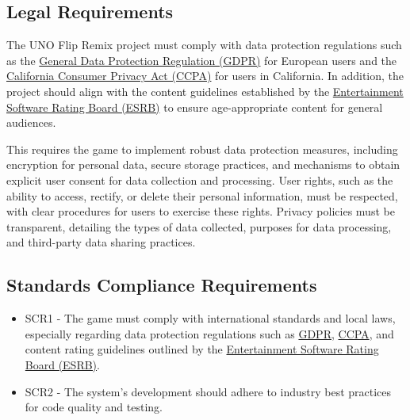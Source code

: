 \documentclass[12pt]{article}
\begin{document}
\subsection{Legal Requirements}
The UNO Flip Remix project must comply with data protection regulations such as the \href{https://gdpr.eu/}{General Data Protection Regulation (GDPR)} for European users and the \href{https://oag.ca.gov/privacy/ccpa}{California Consumer Privacy Act (CCPA)} for users in California. In addition, the project should align with the content guidelines established by the \href{https://www.esrb.org/ratings-guide/}{Entertainment Software Rating Board (ESRB)} to ensure age-appropriate content for general audiences.

This requires the game to implement robust data protection measures, including encryption for personal data, secure storage practices, and mechanisms to obtain explicit user consent for data collection and processing. User rights, such as the ability to access, rectify, or delete their personal information, must be respected, with clear procedures for users to exercise these rights. Privacy policies must be transparent, detailing the types of data collected, purposes for data processing, and third-party data sharing practices.



\subsection{Standards Compliance Requirements}
\begin{itemize}
    \item SCR1 - The game must comply with international standards and local laws, especially regarding data protection regulations such as \href{https://gdpr.eu/}{GDPR}, \href{https://oag.ca.gov/privacy/ccpa}{CCPA}, and content rating guidelines outlined by the \href{https://www.esrb.org/}{Entertainment Software Rating Board (ESRB)}.

    \item SCR2 - The system’s development should adhere to industry best practices for code quality and testing.
\end{itemize}
\end{document}
